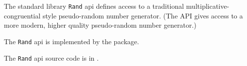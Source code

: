 
The standard library {\tt Rand} api defines access to a traditional multiplicative-congruential 
style pseudo-random number generator.  (The  API gives access 
to a more modern, higher quality pseudo-random number generator.)

The {\tt Rand} api is implemented by the  package.

The {\tt Rand} api source code is in .
